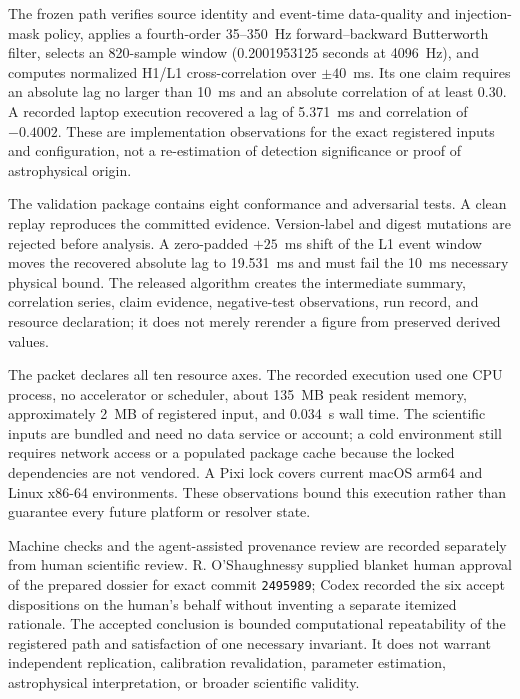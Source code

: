 \documentclass[11pt]{article}
\begin{document}
The frozen path verifies source identity and event-time data-quality and injection-mask policy, applies a fourth-order 35--350~Hz forward--backward Butterworth filter, selects an 820-sample window (0.2001953125 seconds at 4096~Hz), and computes normalized H1/L1 cross-correlation over $\pm 40$~ms. Its one claim requires an absolute lag no larger than 10~ms and an absolute correlation of at least 0.30. A recorded laptop execution recovered a lag of 5.371~ms and correlation of $-0.4002$. These are implementation observations for the exact registered inputs and configuration, not a re-estimation of detection significance or proof of astrophysical origin.

The validation package contains eight conformance and adversarial tests. A clean replay reproduces the committed evidence. Version-label and digest mutations are rejected before analysis. A zero-padded $+25$~ms shift of the L1 event window moves the recovered absolute lag to 19.531~ms and must fail the 10~ms necessary physical bound. The released algorithm creates the intermediate summary, correlation series, claim evidence, negative-test observations, run record, and resource declaration; it does not merely rerender a figure from preserved derived values.

The packet declares all ten resource axes. The recorded execution used one CPU process, no accelerator or scheduler, about 135~MB peak resident memory, approximately 2~MB of registered input, and 0.034~s wall time. The scientific inputs are bundled and need no data service or account; a cold environment still requires network access or a populated package cache because the locked dependencies are not vendored. A Pixi lock covers current macOS arm64 and Linux x86-64 environments. These observations bound this execution rather than guarantee every future platform or resolver state.

Machine checks and the agent-assisted provenance review are recorded separately from human scientific review. R. O'Shaughnessy supplied blanket human approval of the prepared dossier for exact commit \texttt{2495989}; Codex recorded the six accept dispositions on the human's behalf without inventing a separate itemized rationale. The accepted conclusion is bounded computational repeatability of the registered path and satisfaction of one necessary invariant. It does not warrant independent replication, calibration revalidation, parameter estimation, astrophysical interpretation, or broader scientific validity.
\end{document}
